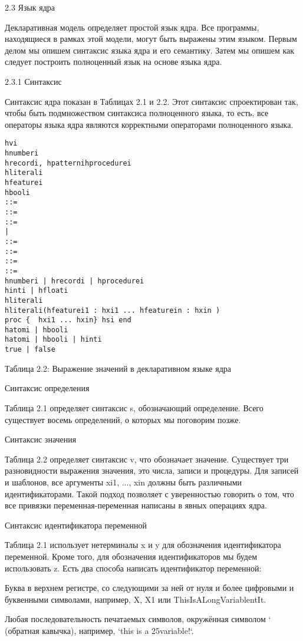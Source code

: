 2.3 Язык ядра

Декларативная модель определяет простой язык ядра. Все программы, находящиеся в рамках этой модели, могут быть выражены этим языком. Первым делом мы опишем синтаксис языка ядра и его семантику. Затем мы опишем как следует построить полноценный язык на основе языка ядра.

2.3.1 Синтаксис

Синтаксис ядра показан в Таблицах 2.1 и 2.2. Этот синтаксис спроектирован так, чтобы быть подмножеством синтаксиса полноценного языка, то есть, все операторы языка ядра являются корректными операторами полноценного языка.

\begin{lstlisting}
hvi
hnumberi
hrecordi, hpatternihprocedurei
hliterali
hfeaturei
hbooli
::=
::=
::=
|
::=
::=
::=
::=
hnumberi | hrecordi | hprocedurei
hinti | hfloati
hliterali
hliterali(hfeaturei1 : hxi1 ... hfeaturein : hxin )
proc {  hxi1 ... hxin} hsi end
hatomi | hbooli
hatomi | hbooli | hinti
true | false
\end{lstlisting}

Таблица 2.2: Выражение значений в декларативном языке ядра

Синтаксис определения

Таблица 2.1 определяет синтаксис s, обозначающий определение. Всего существует восемь определений, о которых мы поговорим позже.

Синтаксис значения

Таблица 2.2 определяет синтаксис v, что обозначает значение. Существует три разновидности выражения значения, это числа, записи и процедуры. Для записей и шаблонов, все аргументы xi1, ..., xin должны быть различными идентификаторами. Такой подход позволяет с уверенностью говорить о том, что все привязки переменная-переменная написаны в явных операциях ядра.

Синтаксис идентификатора переменной

Таблица 2.1 использует нетерминалы x и y для обозначения идентификатора переменной. Кроме того, для обозначения идентификаторов мы будем использовать z. Есть два способа написать идентификатор переменной:

Буква в верхнем регистре, со следующими за ней от нуля и более цифровыми и буквенными символами, например, X, X1 или ThisIsALongVariablentIt.

Любая последовательность печатаемых символов, окружённая символом ` (обратная кавычка), например, `this is a 25variable!`.


